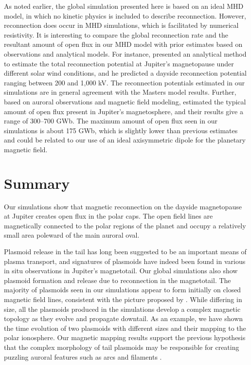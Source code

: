 As noted earlier, the global simulation presented here is based on an ideal MHD model, in which no kinetic physics is included to describe reconnection. However, reconnection does occur in MHD simulations, which is facilitated by numerical resistivity. It is interesting to compare the global reconnection rate and the resultant amount of open flux in our MHD model with prior estimates based on observations and analytical models. For instance,  presented an analytical method to estimate the total reconnection potential at Jupiter's magnetopause under different solar wind conditions, and he predicted a dayside reconnection potential ranging between 200 and 1,000 kV. The reconnection potentials estimated in our simulations are in general agreement with the Masters model results. Further, based on auroral observations and magnetic field modeling,  estimated the typical amount of open flux present in Jupiter's magnetosphere, and their results give a range of 300–700 GWb. The maximum amount of open flux seen in our simulations is about 175 GWb, which is slightly lower than previous estimates and could be related to our use of an ideal axisymmetric dipole for the planetary magnetic field.

\section{Summary}

Our simulations show that magnetic reconnection on the dayside magnetopause at Jupiter creates open flux in the polar caps. The open field lines are magnetically connected to the polar regions of the planet and occupy a relatively small area poleward of the main auroral oval. 

Plasmoid release in the tail has long been suggested to be an important means of plasma transport, and signatures of plasmoids have indeed been found in various in situ observations in Jupiter's magnetotail. Our global simulations also show plasmoid formation and release due to reconnection in the magnetotail. The majority of plasmoids seen in our simulations appear to form initially on closed magnetic field lines, consistent with the picture proposed by . While differing in size, all the plasmoids produced in the simulations develop a complex magnetic topology as they evolve and propagate downtail. As an example, we have shown the time evolution of two plasmoids with different sizes and their mapping to the polar ionosphere. Our magnetic mapping results support the previous hypothesis that the complex morphology of tail plasmoids may be responsible for creating puzzling auroral features such as arcs and filaments \cite{Grodent2003a,McComas2007,Nichols2009a}. 

